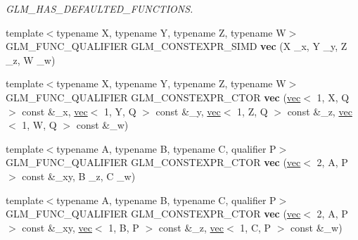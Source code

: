 \begin{DoxyCompactItemize}
\begin{DoxyCompactList}\small\item\em G\+L\+M\+\_\+\+H\+A\+S\+\_\+\+D\+E\+F\+A\+U\+L\+T\+E\+D\+\_\+\+F\+U\+N\+C\+T\+I\+O\+NS. \end{DoxyCompactList}\item 
\mbox{\label{structglm_1_1vec_3_014_00_01T_00_01Q_01_4_a44db69557e499193fa5d8514132c6e24}} 
{\footnotesize template$<$typename X, typename Y, typename Z, typename W$>$ }\\G\+L\+M\+\_\+\+F\+U\+N\+C\+\_\+\+Q\+U\+A\+L\+I\+F\+I\+ER G\+L\+M\+\_\+\+C\+O\+N\+S\+T\+E\+X\+P\+R\+\_\+\+S\+I\+MD {\bfseries vec} (X \+\_\+x, Y \+\_\+y, Z \+\_\+z, W \+\_\+w)
\item 
\mbox{\label{structglm_1_1vec_3_014_00_01T_00_01Q_01_4_af503ad0b89fdb859450b2e0896c8357f}} 
{\footnotesize template$<$typename X, typename Y, typename Z, typename W$>$ }\\G\+L\+M\+\_\+\+F\+U\+N\+C\+\_\+\+Q\+U\+A\+L\+I\+F\+I\+ER G\+L\+M\+\_\+\+C\+O\+N\+S\+T\+E\+X\+P\+R\+\_\+\+C\+T\+OR {\bfseries vec} (\hyperlink{structglm_1_1vec}{vec}$<$ 1, X, Q $>$ const \&\+\_\+x, \hyperlink{structglm_1_1vec}{vec}$<$ 1, Y, Q $>$ const \&\+\_\+y, \hyperlink{structglm_1_1vec}{vec}$<$ 1, Z, Q $>$ const \&\+\_\+z, \hyperlink{structglm_1_1vec}{vec}$<$ 1, W, Q $>$ const \&\+\_\+w)
\item 
\mbox{\label{structglm_1_1vec_3_014_00_01T_00_01Q_01_4_a1624a51ea4a5641d8d6a49dc499fcae9}} 
{\footnotesize template$<$typename A, typename B, typename C, qualifier P$>$ }\\G\+L\+M\+\_\+\+F\+U\+N\+C\+\_\+\+Q\+U\+A\+L\+I\+F\+I\+ER G\+L\+M\+\_\+\+C\+O\+N\+S\+T\+E\+X\+P\+R\+\_\+\+C\+T\+OR {\bfseries vec} (\hyperlink{structglm_1_1vec}{vec}$<$ 2, A, P $>$ const \&\+\_\+xy, B \+\_\+z, C \+\_\+w)
\item 
\mbox{\label{structglm_1_1vec_3_014_00_01T_00_01Q_01_4_af06a1fc4d33ca1bc9b1bf7c54d1b7271}} 
{\footnotesize template$<$typename A, typename B, typename C, qualifier P$>$ }\\G\+L\+M\+\_\+\+F\+U\+N\+C\+\_\+\+Q\+U\+A\+L\+I\+F\+I\+ER G\+L\+M\+\_\+\+C\+O\+N\+S\+T\+E\+X\+P\+R\+\_\+\+C\+T\+OR {\bfseries vec} (\hyperlink{structglm_1_1vec}{vec}$<$ 2, A, P $>$ const \&\+\_\+xy, \hyperlink{structglm_1_1vec}{vec}$<$ 1, B, P $>$ const \&\+\_\+z, \hyperlink{structglm_1_1vec}{vec}$<$ 1, C, P $>$ const \&\+\_\+w)

\end{DoxyCompactItemize}
